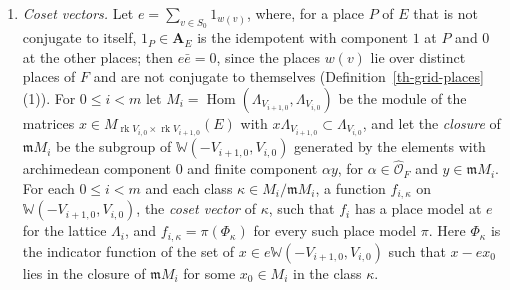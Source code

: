 \begin{definition}
\begin{enumerate}
\item[(W7)] \emph{Coset vectors.} Let $e=\sum_{v\in S_0}1_{w(v)}$, where, for a
  place $P$ of $E$ that is not conjugate to itself, $1_P\in\mathbf A_E$ is the
  idempotent with component $1$ at $P$ and $0$ at the other places; then
  $e\bar e=0$, since the places $w(v)$ lie over distinct places of $F$ and are
  not conjugate to themselves (Definition~\ref{th-grid-places}(1)). For
  $0\leq i<m$ let $M_i=\operatorname{Hom}(\Lambda_{V_{i+1,0}},\Lambda_{V_{i,0}})$
  be the module of the matrices
  $x\in M_{\operatorname{rk}V_{i,0}\times\operatorname{rk}V_{i+1,0}}(E)$ with
  $x\Lambda_{V_{i+1,0}}\subset\Lambda_{V_{i,0}}$, and let the \emph{closure} of
  $\mathfrak mM_i$ be the subgroup of $\mathbb W(-V_{i+1,0},V_{i,0})$ generated
  by the elements with archimedean component $0$ and finite component
  $\alpha y$, for $\alpha\in\hat{\mathcal O}_F$ and $y\in\mathfrak mM_i$. For
  each $0\leq i<m$ and each class $\kappa\in M_i/\mathfrak mM_i$, a function
  $f_{i,\kappa}$ on $\mathbb W(-V_{i+1,0},V_{i,0})$, the \emph{coset vector} of
  $\kappa$, such that $f_i$ has a place model at $e$ for the lattice
  $\Lambda_i$, and $f_{i,\kappa}=\pi(\Phi_\kappa)$ for every such place model
  $\pi$. Here $\Phi_\kappa$ is the indicator function of the set of
  $x\in e\mathbb W(-V_{i+1,0},V_{i,0})$ such that $x-ex_0$ lies in the closure
  of $\mathfrak mM_i$ for some $x_0\in M_i$ in the class $\kappa$.
\end{enumerate}
\end{definition}
